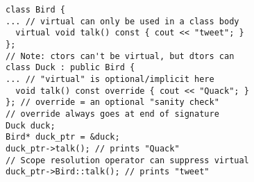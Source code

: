 \documentclass[7pt, twocolumn]{extarticle}
\newcommand{\myinline}[1]{\lstinline[basicstyle={\fontsize{5pt}{6}\ttfamily}]{#1}}
\begin{document}
\begin{small}
\begin{minipage}[c]{4.9cm}
   \end{minipage}
   \hspace{0pt}
   \begin{minipage}[c]{5.3cm}
   \begin{tcolorbox}[top=-5pt,bottom=-5pt,left=-1pt,right=-1pt,boxrule=0.5pt,arc=0pt]
              {
              \begin{lstlisting}[style = mystyle]
class Bird {
... // virtual can only be used in a class body
  virtual void talk() const { cout << "tweet"; }
}; 
// Note: ctors can't be virtual, but dtors can
class Duck : public Bird {
... // "virtual" is optional/implicit here
  void talk() const override { cout << "Quack"; }
}; // override = an optional "sanity check"
// override always goes at end of signature
Duck duck;
Bird* duck_ptr = &duck;
duck_ptr->talk(); // prints "Quack"
// Scope resolution operator can suppress virtual
duck_ptr->Bird::talk(); // prints "tweet"
\end{lstlisting}
}
\end{tcolorbox}
\end{minipage}





\end{small}
\end{document}
